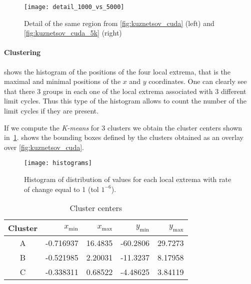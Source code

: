 \begin{figure}[H]
\centering
\texttt{[image: detail\_1000\_vs\_5000]}
\caption{Detail of the same region from \cref{fig:kuznetsov_cuda} (left) and \cref{fig:kuznetsov_cuda_5k} (right)
}
\label{fig:detail1kvs5k}
\end{figure}

\paragraph{Clustering}

 shows the histogram of the positions of the four local extrema, that is the maximal and minimal positions of the $x$ and $y$ coordinates.
One can clearly see that there 3 groups in each one of the local extrema associated with 3 different limit cycles.
Thus this type of the histogram allows to count the number of the limit cycles if they are present.

If we compute the \emph{K-means} for 3 clusters we obtain the cluster centers shown in~\cref{tab:clusters}.  shows the bounding boxes defined by the clusters obtained as an overlay over \cref{fig:kuznetsov_cuda}.

\begin{figure}[H]
    \centering
    \texttt{[image: histograms]}
    \caption[Distribution values for local extrema]%
    {Histogram of distribution of values for each local extrema with rate of
        change equal to 1 (tol $1^{-6}$).
    }%
    \label{fig:histograms}
\end{figure}

\begin{table}[H]
    \centering
    \caption{Cluster centers}%
    \label{tab:clusters}
    \begin{tabular}{crrrr}
        \toprule
        Cluster & $x_{\min}$ & $x_{\max}$ & $y_{\min}$ & $y_{\max}$ \\ \midrule
        A & -0.716937 & 16.4835  & -60.2806  & 29.7273 \\
        B & -0.521985 &  2.20031 & -11.3237  &  8.17958 \\
        C & -0.338311 &  0.68522 &  -4.48625 &  3.84119 \\
        \bottomrule
    \end{tabular}
\end{table}

